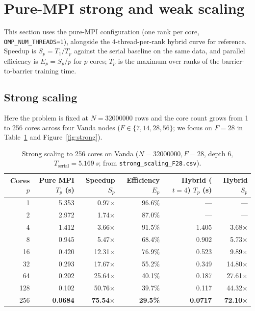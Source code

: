 \documentclass[11pt]{article}
\begin{document}
\section{Pure-MPI strong and weak scaling}\label{sec:mpi}

This section uses the pure-MPI configuration (one rank per core, \texttt{OMP\_NUM\_THREADS=1}), alongside the $4$-thread-per-rank hybrid curve for reference. Speedup is $S_p = T_1/T_p$ against the serial baseline on the same data, and parallel efficiency is $E_p = S_p/p$ for $p$ cores; $T_p$ is the maximum over ranks of the barrier-to-barrier training time.

\subsection{Strong scaling}

Here the problem is fixed at $N=\num{32000000}$ rows and the core count grows from \num{1} to \num{256} cores across four Vanda nodes ($F\in\{7,14,28,56\}$; we focus on $F=\num{28}$ in Table~\ref{tab:strong} and Figure~\ref{fig:strong}).

\begin{table}[H]
\centering
\caption{Strong scaling to \num{256} cores on Vanda ($N=\num{32000000}, F=\num{28}$, depth \num{6}, $T_{\text{serial}}=\SI{5.169}{s}$; from \texttt{strong\_scaling\_F28.csv}).}
\label{tab:strong}
\begin{tabular}{rrrrrr}
\toprule
Cores $p$ & Pure MPI $T_p$ (s) & Speedup $S_p$ & Efficiency $E_p$ & Hybrid ($t=4$) $T_p$ (s) & Hybrid $S_p$ \\
\midrule
  1 & 5.353 &  0.97$\times$ & 96.6\% &    --- &    --- \\
  2 & 2.972 &  1.74$\times$ & 87.0\% &    --- &    --- \\
  4 & 1.412 &  3.66$\times$ & 91.5\% & 1.405  &  3.68$\times$ \\
  8 & 0.945 &  5.47$\times$ & 68.4\% & 0.902  &  5.73$\times$ \\
 16 & 0.420 & 12.31$\times$ & 76.9\% & 0.523  &  9.89$\times$ \\
 32 & 0.293 & 17.67$\times$ & 55.2\% & 0.349  & 14.80$\times$ \\
 64 & 0.202 & 25.64$\times$ & 40.1\% & 0.187  & 27.61$\times$ \\
128 & 0.102 & 50.76$\times$ & 39.7\% & 0.117  & 44.32$\times$ \\
256 & \textbf{0.0684} & \textbf{75.54$\times$} & \textbf{29.5\%} & \textbf{0.0717} & \textbf{72.10$\times$} \\
\bottomrule
\end{tabular}
\end{table}
\end{document}
